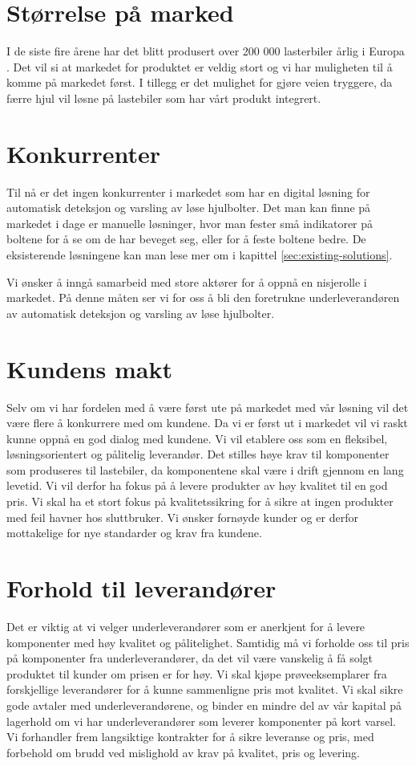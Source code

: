 \section{Størrelse på marked}
I de siste fire årene har det blitt produsert over 200 000 lasterbiler årlig 
i Europa \cite{lastebilprod-DAF}. Det vil si at markedet for produktet er 
veldig stort og vi har muligheten til å komme på markedet først. I tillegg er 
det mulighet for gjøre veien tryggere, da færre hjul vil løsne på lastebiler 
som har vårt produkt integrert.

\section{Konkurrenter}
Til nå er det ingen konkurrenter i markedet som har en digital løsning for 
automatisk deteksjon og varsling av løse hjulbolter. Det man kan finne på 
markedet i dage er manuelle løsninger, hvor man fester små indikatorer på 
boltene for å se om de har beveget seg, eller for å feste boltene bedre. De 
eksisterende løsningene kan man lese mer om i kapittel \ref{sec:existing-solutions}.

Vi ønsker å inngå samarbeid med store aktører for å oppnå en nisjerolle i 
markedet. På denne måten ser vi for oss å bli den foretrukne 
underleverandøren av automatisk deteksjon og varsling av løse hjulbolter.

\section{Kundens makt}
Selv om vi har fordelen med å være først ute på markedet med vår løsning vil 
det være flere å konkurrere med om kundene. Da vi er først ut i markedet vil 
vi raskt kunne oppnå en god dialog med kundene. Vi vil etablere oss som en 
fleksibel, løsningsorientert og pålitelig leverandør. Det stilles høye krav 
til komponenter som produseres til lastebiler, da komponentene skal være i 
drift gjennom en lang levetid. Vi vil derfor ha fokus på å levere produkter 
av høy kvalitet til en god pris. Vi skal ha et stort fokus på 
kvalitetssikring for å sikre at ingen produkter med feil havner hos 
sluttbruker. Vi ønsker fornøyde kunder og er derfor mottakelige for nye 
standarder og krav fra kundene. 

\section{Forhold til leverandører}
Det er viktig at vi velger underleverandører som er anerkjent for å levere 
komponenter med høy kvalitet og pålitelighet. Samtidig må vi forholde oss til 
pris på komponenter fra underleverandører, da det vil være vanskelig å få 
solgt produktet til kunder om prisen er for høy. Vi skal kjøpe 
prøveeksemplarer fra forskjellige leverandører for å kunne sammenligne pris 
mot kvalitet. Vi skal sikre gode avtaler med underleverandørene, og binder en 
mindre del av vår kapital på lagerhold om vi har underleverandører som 
leverer komponenter på kort varsel. Vi forhandler frem langsiktige kontrakter 
for å sikre leveranse og pris, med forbehold om brudd ved mislighold av krav 
på kvalitet, pris og levering. 

